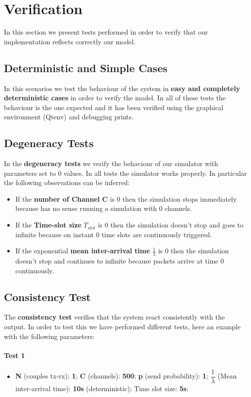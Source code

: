 \section{Verification}
In this section we present tests performed in order to verify that our implementation reflects correctly our model.

\subsection{Deterministic and Simple Cases}
In this scenarios we test the behaviour of the system in \textbf{easy and completely deterministic cases} in order to verify the model. In all of these tests the behaviour is the one expected and it has been verified using the graphical environment (Qtenv) and debugging prints.

\subsection{Degeneracy Tests}
In the \textbf{degeneracy tests} we verify the behaviour of our simulator with parameters set to 0 values. In all tests the simulator works properly. In particular the following observations can be inferred:
\begin{itemize}
	\item If the \textbf{number of Channel} \textbf{C} is 0 then the simulation stops immediately because has no sense running a simulation with 0 channels.
	\item If the \textbf{Time-slot size} $T_{slot}$ is 0 then the simulation doesn't stop and goes to infinite because on instant 0  time slots are continuously triggered.
	\item If the exponential \textbf{mean inter-arrival time} $\frac{1}{\lambda}$ is 0 then the simulation doesn't stop and continues to infinite because packets arrive at time 0 continuously.
\end{itemize}

\subsection{Consistency Test}
The \textbf{consistency test} verifies that the system react consistently with the output. In order to test this we have performed different tests, here an example with the following parameters:
\paragraph{Test 1}
\begin{itemize}
	\item \textbf{N} (couples t\textbf{}x-rx): \textbf{1}; \textbf{C} (channels): \textbf{500}; \textbf{p} (send probability): \textbf{1}; $\dfrac{1}{\lambda}$ (Mean inter-arrival time): \textbf{10s} (deterministic); Time slot size: \textbf{5s};
\end{itemize}

